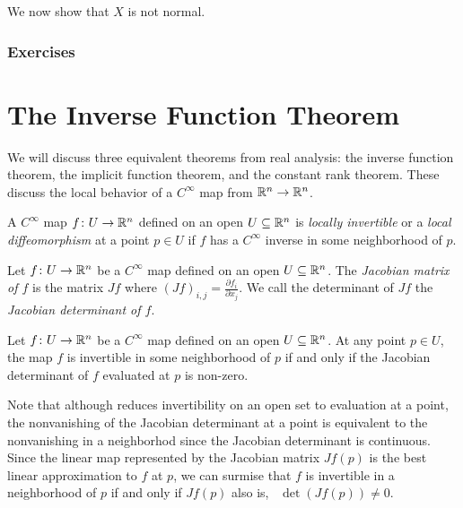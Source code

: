 \documentclass[letterpaper, 11pt, oneside]{book}
\begin{document}
\begin{ex}
  We now show that $X$ is not normal.
\end{ex}
\clearpage

\subsection*{Exercises}

\clearpage

\chapter{The Inverse Function Theorem}

We will discuss three equivalent theorems from real analysis: the inverse function theorem, the implicit function theorem, and the constant rank theorem.
These discuss the local behavior of a $C^{\infty}$ map from $\mathbb{R}^{n} \to \mathbb{R}^{n}$.

\begin{defn}
  A $C^{\infty}$ map $f\colon U \to \mathbb{R}^{n}$ defined on an open $U \subseteq \mathbb{R}^{n}$ is \emph{locally invertible} or a \emph{local diffeomorphism} at a point $p \in U$ if $f$ has a $C^{\infty}$ inverse in some neighborhood of $p$.
\end{defn}

\begin{defn}[Jacobian]
  Let $f\colon U \to \mathbb{R}^{n}$ be a $C^{\infty}$ map defined on an open $U \subseteq \mathbb{R}^{n}$.
  The \emph{Jacobian matrix of $f$} is the matrix $Jf$ where $(Jf)_{i, j} = \frac{\partial f_{i}}{\partial x_{j}}$.
  We call the determinant of $Jf$ the \emph{Jacobian determinant of $f$}.
\end{defn}

\begin{thrm}\label{thrm: inverse_func}
  Let $f\colon U \to \mathbb{R}^{n}$ be a $C^{\infty}$ map defined on an open $U \subseteq \mathbb{R}^{n}$.
  At any point $p \in U$, the map $f$ is invertible in some neighborhood of $p$ if and only if the Jacobian determinant of $f$ evaluated at $p$ is non-zero.
\end{thrm}
Note that although  reduces invertibility on an open set to evaluation at a point, the nonvanishing of the Jacobian determinant at a point is equivalent to the nonvanishing in a neighborhod since the Jacobian determinant is continuous.
Since the linear map represented by the Jacobian matrix $Jf(p)$ is the best linear approximation to $f$ at $p$, we can surmise that $f$ is invertible in a neighborhood of $p$ if and only if $Jf(p)$ also is, \ie\ $\det(Jf(p)) \neq 0$.
\end{document}
